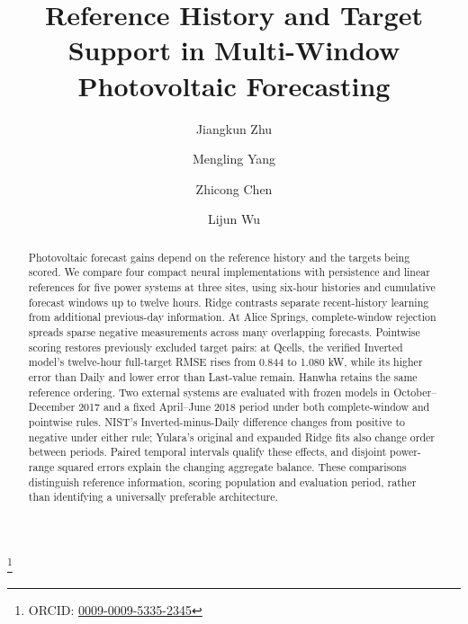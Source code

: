 \documentclass[aip,reprint,floatfix,amsmath,amssymb]{revtex4-2}
\begin{document}
\raggedbottom
{}
\title{Reference History and Target Support in Multi-Window Photovoltaic Forecasting}

\author{Jiangkun Zhu}
\thanks{ORCID: \href{https://orcid.org/0009-0009-5335-2345}{0009-0009-5335-2345}}
\author{Mengling Yang}
\author{Zhicong Chen}
\author{Lijun Wu}



\begin{abstract}
Photovoltaic forecast gains depend on the reference history and the targets being scored. We compare four compact neural implementations with persistence and linear references for five power systems at three sites, using six-hour histories and cumulative forecast windows up to twelve hours. Ridge contrasts separate recent-history learning from additional previous-day information. At Alice Springs, complete-window rejection spreads sparse negative measurements across many overlapping forecasts. Pointwise scoring restores previously excluded target pairs: at Qcells, the verified Inverted model's twelve-hour full-target RMSE rises from 0.844 to 1.080 kW, while its higher error than Daily and lower error than Last-value remain. Hanwha retains the same reference ordering. Two external systems are evaluated with frozen models in October--December 2017 and a fixed April--June 2018 period under both complete-window and pointwise rules. NIST's Inverted-minus-Daily difference changes from positive to negative under either rule; Yulara's original and expanded Ridge fits also change order between periods. Paired temporal intervals qualify these effects, and disjoint power-range squared errors explain the changing aggregate balance. These comparisons distinguish reference information, scoring population and evaluation period, rather than identifying a universally preferable architecture.
\end{abstract}
\maketitle
\end{document}
